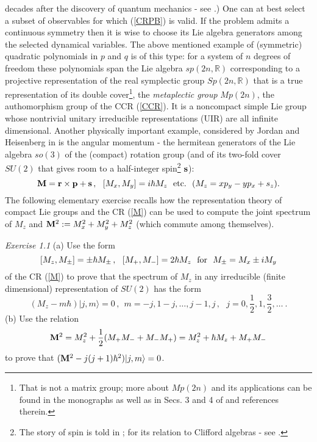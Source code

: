 \documentclass[12pt]{article}
\begin{document}
decades after the discovery of quantum mechanics - see \cite{G46, V51}.)
 One can at best select a subset of observables for which (\ref{CRPB}) is valid.
 If the problem admits a continuous symmetry then it is wise to choose its Lie
algebra generators among the selected dynamical variables. The above mentioned
example of (symmetric) quadratic polynomials in $p$ and $q$ is of this type:
for a system of $n$ degrees of freedom these polynomials span the Lie algebra
$sp(2n, \mathbb{R})$ corresponding to a projective representation of the real
symplectic group $Sp(2n, \mathbb{R})$ that is a true representation of its
double cover\footnote{That is not a matrix group; more about $Mp(2n)$ and its applications 
can be found in the monographs \cite{F, deG} as well as in Secs. 3 and 4 of 
\cite{T10} and references therein.}, the {\it metaplectic
group} $Mp(2n)$, the authomorphism group of the CCR (\ref{CCR}). It is a
noncompact simple Lie group whose nontrivial unitary irreducible representations
(UIR) are all infinite dimensional. Another physically important example,
considered by Jordan and Heisenberg in \cite{BHJ} is the angular momentum -
the hermitean generators of the Lie algebra $so(3)$ of the (compact) rotation
group (and of its two-fold cover $SU(2)$ that gives room to a half-integer spin\footnote{The story of spin 
is told in \cite{Tom}; for its relation to Clifford algebras - see \cite{T11}.} ${\bf s}$):
\begin{equation}
\label{M}
{\bf M} = {\bf r}\times {\bf p} + {\bf s} \,, \  \ [M_x, M_y] = i\hbar M_z \ \ {\rm etc.} \ \ (M_z = xp_y - yp_x +s_z).
\end{equation}
The following elementary exercise recalls how the representation theory of compact Lie groups
and the CR (\ref{M}) can be used to compute the joint spectrum of $M_z$ and ${\bf M}^2 :=
M_x^2 + M_y^2 + M_z^2$ (which commute among themselves).

{\it Exercise 1.1} (a) Use the form
\begin{equation}
\label{Mpm}
[M_z, M_{\pm}] = \pm \hbar M_{\pm}\,, \ \ [M_+, M_-] = 2\hbar M_z \ \ {\rm for} \ \ M_\pm = M_x \pm i M_y
\end{equation}
of the CR (\ref{M}) to prove that the spectrum of $M_z$ in any irreducible (finite dimensional) representation of
$SU(2)$ has the form
\begin{equation}
\label{Mz}
(M_z - m\hbar) |j, m\rangle = 0\,, \ \ m = -j, 1-j, \dots ,j-1, j\,,\ \ \ j = 0, \frac{1}{2}, 1, \frac{3}{2}, \dots \ .
\end{equation}
(b) Use the relation
\begin{equation}
\label{M2}
{\bf M}^2 = M_z^2 +\frac{1}{2}(M_+ M_- + M_- M_+) = M_z^2 + \hbar M_z + M_+M_-
\end{equation}
to prove that $({\bf M}^2 - j(j+1)\hbar^2)|j, m\rangle = 0$. 
\end{document}
